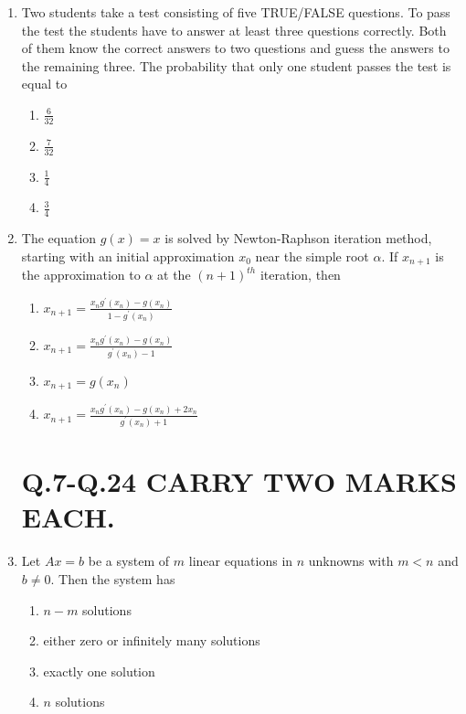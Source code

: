 \documentclass[journal,12pt,twocolumn]{IEEEtran}
\theoremstyle{remark}
\begin{document}
\begin{enumerate}
    \item Two students take a test consisting of five TRUE/FALSE questions. To pass the test the students have to answer at least three questions correctly. Both of them know the correct answers to two questions and guess the answers to the remaining three. The probability that only one student passes the test is equal to
        \begin{enumerate}
            \item $\frac{6}{32}$
            \item $\frac{7}{32}$
            \item $\frac{1}{4}$
            \item $\frac{3}{4}$
        \end{enumerate}

    \item The equation $g(x)=x$ is solved by Newton-Raphson iteration method, starting with an initial approximation $x_0$ near the simple root $\alpha$. If $x_{n+1}$ is the approximation to $\alpha$ at the $(n+1)^{th}$ iteration, then
        \begin{enumerate}
            \item $x_{n+1}=\frac{x_ng^\prime(x_n)-g(x_n)}{1-g^\prime(x_n)}$
            \item $x_{n+1}=\frac{x_ng^\prime(x_n)-g(x_n)}{g^\prime(x_n)-1}$
            \item $x_{n+1}=g(x_n)$
            \item $x_{n+1}=\frac{x_ng^\prime(x_n)-g(x_n)+2x_n}{g^\prime(x_n)+1}$
        \end{enumerate}

\bigskip

\section*{Q.7-Q.24 CARRY TWO MARKS EACH.}

\bigskip

    \item Let $Ax=b$ be a system of $m$ linear equations in $n$ unknowns with $m<n$ and $b\neq0$. Then the system has
        \begin{enumerate}
            \item $n-m$ solutions
            \item either zero or infinitely many solutions
            \item exactly one solution
            \item $n$ solutions
        \end{enumerate}



\end{enumerate}
\end{document}
